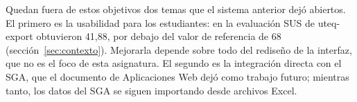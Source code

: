 Quedan fuera de estos objetivos dos temas que el sistema anterior dejó abiertos. El primero es la usabilidad para los estudiantes: en la evaluación SUS de uteq-export obtuvieron 41,88, por debajo del valor de referencia de 68 (sección~\ref{sec:contexto}). Mejorarla depende sobre todo del rediseño de la interfaz, que no es el foco de esta asignatura. El segundo es la integración directa con el SGA, que el documento de Aplicaciones Web dejó como trabajo futuro; mientras tanto, los datos del SGA se siguen importando desde archivos Excel.
